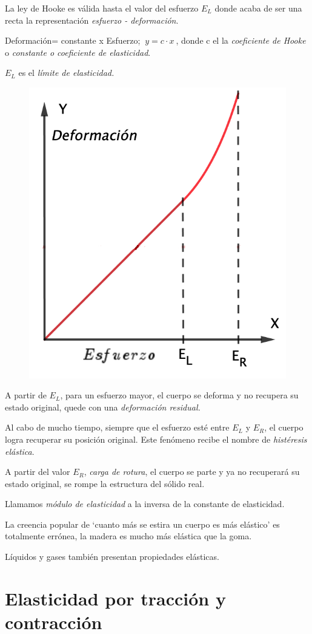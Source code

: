 \begin{multicols}{2}

La ley de Hooke es válida hasta el valor del esfuerzo $E_L$ donde acaba de ser una recta la representación \emph{esfuerzo - deformación}.

Deformación= constante x Esfuerzo; $\ y=c\cdot x\ $, donde c el la \emph{coeficiente de Hooke} o \emph{constante o coeficiente de elasticidad}.

$E_L$ es el \emph{límite de elasticidad.}
\begin{figure}[H]
	\centering
	\includegraphics[width=.4\textwidth]{imagenes/imagenes09/T09IM01.png}
\end{figure}
\end{multicols}

A partir de $E_L$, para un esfuerzo mayor, el cuerpo se deforma y no recupera su estado original, quede con una \emph{deformación residual.}

Al cabo de mucho tiempo, siempre que el esfuerzo esté entre $E_L$ y $E_R$, el cuerpo logra recuperar su posición original. Este fenómeno recibe el nombre de \emph{histéresis elástica}.

A partir del valor $E_R$, \emph{carga de rotura}, el cuerpo se parte y ya no recuperará su estado original, se rompe la estructura del sólido real.

Llamamos \emph{módulo de elasticidad} a la inversa de la constante de elasticidad.

La creencia popular de `cuanto más se estira un cuerpo es más elástico' es totalmente errónea, la madera es mucho más elástica que la goma.

Líquidos y gases también presentan propiedades elásticas.

\section{Elasticidad por tracción y contracción}

